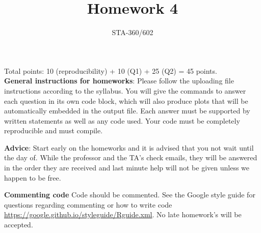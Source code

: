 \documentclass{article}
\begin{document}
\title{Homework 4}
\author{STA-360/602}
\date{}
\maketitle

Total points: 10 (reproducibility) + 10 (Q1) + 25 (Q2) = 45 points. \\

\textbf{General instructions for homeworks}: Please follow the uploading file instructions according to the syllabus. You will give the commands to answer each question in its own code block, which will also produce plots that will be automatically embedded in the output file. Each answer must be supported by written statements as well as any code used. Your code must be completely reproducible and must compile. 

\textbf{Advice}: Start early on the homeworks and it is advised that you not wait until the day of. While the professor and the TA's check emails, they will be answered in the order they are received and last minute help will not be given unless we happen to be free.  

\textbf{Commenting code}
Code should be commented. See the Google style guide for questions regarding commenting or how to write 
code \url{https://google.github.io/styleguide/Rguide.xml}. No late homework's will be accepted.
\end{document}
